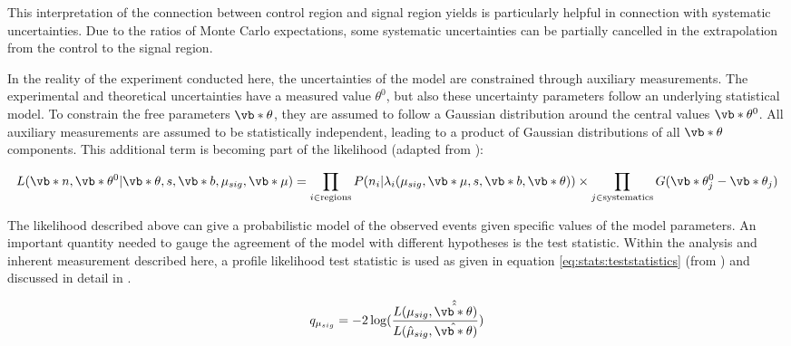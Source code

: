 This interpretation of the connection between control region and signal region yields is particularly helpful in connection with systematic uncertainties.  Due to the ratios of Monte Carlo expectations,  some systematic uncertainties can be partially cancelled in the extrapolation from the control to the signal region. 

In the reality of the experiment conducted here, the uncertainties of the model are constrained through auxiliary measurements.  The experimental and theoretical uncertainties have a measured value $\theta^0$,  but also these uncertainty parameters follow an underlying statistical model.  To constrain the free parameters $\vb*{\theta}$, they are assumed to follow a Gaussian distribution around the central values $\vb*{\theta^0}$.  All auxiliary measurements are assumed to be statistically independent,  leading to a product of Gaussian distributions of all $\vb*{\theta}$ components.  This additional term is becoming part of the likelihood (adapted from \cite{HistFitter}): 
 
 \begin{align}
L(\vb*{n}, \vb*{\theta^0}|\vb*{\theta}, s, \vb*{b}, \mu_{sig}, \vb*{\mu}) = \prod_{i \in \text{regions}} P(n_i | \lambda_i(\mu_{sig},\vb*{\mu}, s, \vb*{b}, \vb*{\theta})) \times \prod_{j \in \text{systematics}} G( \vb*{\theta}^0_j -  \vb*{\theta}_j)
\label{eq:stats:likelihoodWGaussian}
\end{align}

The likelihood described above can give a probabilistic model of the observed events given specific values of the model parameters.  
An important quantity needed to gauge the agreement of the model with different hypotheses is the test statistic.  Within the analysis and inherent measurement described here,  a profile likelihood test statistic is used as given in equation \eqref{eq:stats:teststatistics} (from \cite{HistFitter}) and discussed in detail in \cite{TestStatistics}.  

\begin{align}
q_{\mu_{sig}} = -2 \log(\frac{L(\mu_{sig},\hat{\hat{ \vb*{\theta}}})}{L(\hat{\mu}_{sig},\hat{ \vb*{\theta}})})
\label{eq:stats:teststatistics}
\end{align}

